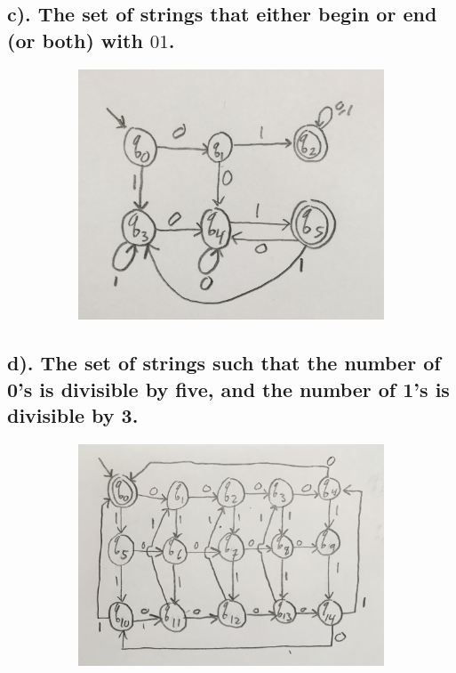 \documentclass[20pt]{article} %
\begin{document}
\subsection{c). The set of strings that either begin or end (or both) with $01$.}
\begin{figure}[!htbp]
  	\centering
   	\begin{subfigure}[p]{0.6\linewidth}
    	\includegraphics[width=\linewidth]{./figures/H1-2c.jpg}
   	\end{subfigure}
\end{figure} 
\subsection{d). The set of strings such that the number of 0's is divisible by five, and the number of 1's is divisible by 3.}
\begin{figure}[!htbp]
  	\centering
   	\begin{subfigure}[p]{0.8\linewidth}
    	\includegraphics[width=\linewidth]{./figures/H1-2d.jpg}
   	\end{subfigure}
\end{figure} 
\end{document}
